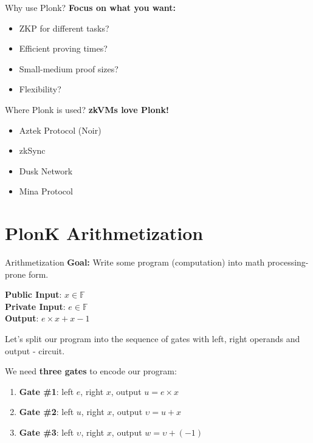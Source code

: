 \documentclass{zkdl-presentation-template}
\begin{document}
    \begin{frame}{Why use Plonk?}
        \textbf{Focus on what you want:}
        \begin{itemize}
            \item ZKP for different tasks?
            \item Efficient proving times?
            \item Small-medium proof sizes?
            \item Flexibility?
        \end{itemize}
    \end{frame}

    \begin{frame}{Where Plonk is used?}
        \textbf{zkVMs love Plonk!}
        \begin{itemize}
            \item Aztek Protocol (Noir)
            \item zkSync
            \item Dusk Network
            \item Mina Protocol
        \end{itemize}
    \end{frame}

    \section{PlonK Arithmetization}

    \begin{frame}{Arithmetization}
        \textbf{Goal:} Write some program (computation) into math processing-prone form.
        \begin{example}
            \textbf{Public Input}: $x \in \mathbb{F}$ \\
            \textbf{Private Input}: $e \in \mathbb{F}$ \\
            \textbf{Output}: $e \times x + x - 1$ \\
        \end{example}
        \pause Let's split our program into the sequence of gates with left, right operands and output - circuit.
        \begin{example}
            We need \textbf{three gates} to encode our program:
            \\
            \begin{enumerate}
                \item \textbf{Gate \#1}: left $e$, right $x$, output \(u = e \times x\)\pause
                \item \textbf{Gate \#2}: left $u$, right $x$, output \(\upsilon = u + x\)\pause
                \item \textbf{Gate \#3}: left $\upsilon$, right $x$, output \(w = \upsilon + (-1)\)
            \end{enumerate}
        \end{example}
    \end{frame}
\end{document}

